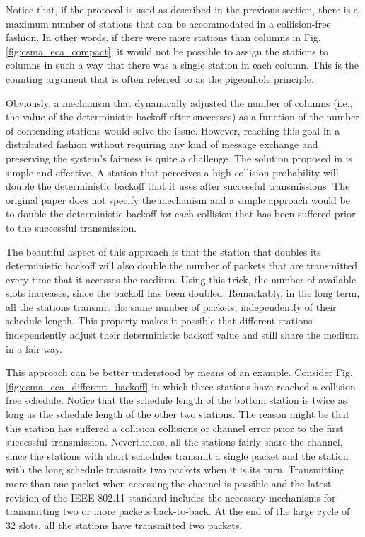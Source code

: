 \documentclass[journal]{IEEEtran}
\begin{document}
Notice that, if the protocol is used as described in the previous section, there is a maximum number of stations that can be accommodated in a collision-free fashion.
In other words, if there were more stations than columns in Fig. \ref{fig:csma_eca_compact}, it would not be possible to assign the stations to columns in such a way that there was a single station in each column.
This is the counting argument that is often referred to as the pigeonhole principle.

Obviously, a mechanism that dynamically adjusted the number of columns (i.e., the value of the deterministic backoff after successes) as a function of the number of contending stations would solve the issue.
However, reaching this goal in a distributed fashion without requiring any kind of message exchange and preserving the system's fairness is quite a challenge.
The solution proposed in \cite{fang2011dlm} is simple and effective.
A station that perceives a high collision probability will double the deterministic backoff that it uses after successful transmissions.
The original paper \cite{fang2011dlm} does not specify the mechanism and a simple approach would be to double the deterministic backoff for each collision that has been suffered prior to the successful transmission.

The beautiful aspect of this approach is that the station that doubles its deterministic backoff will also double the number of packets that are transmitted every time that it accesses the medium.
Using this trick, the number of available slots increases, since the backoff has been doubled.
Remarkably, in the long term, all the stations transmit the same number of packets, independently of their schedule length.
This property makes it possible that different stations independently adjust their deterministic backoff value and still share the medium in a fair way.

This approach can be better understood by means of an example.
Consider Fig. \ref{fig:csma_eca_different_backoff} in which three stations have reached a collision-free schedule.
Notice that the schedule length of the bottom station is twice as long as the schedule length of the other two stations.
The reason might be that this station has suffered a collision collisions or channel error prior to the first successful transmission.
Nevertheless, all the stations fairly share the channel, since the stations with short schedules transmit a single packet and the station with the long schedule transmits two packets when it is its turn.
Transmitting more than one packet when accessing the channel is possible and the latest revision of the IEEE 802.11 standard includes the necessary mechanisms for transmitting two or more packets back-to-back.
At the end of the large cycle of 32 slots, all the stations have transmitted two packets.
\end{document}
